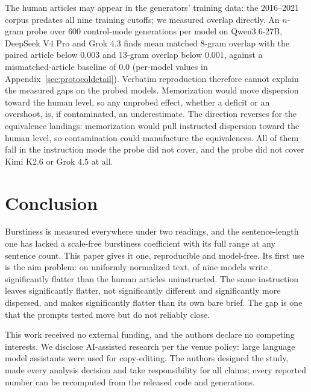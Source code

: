 \documentclass{article}
\begin{document}
The human articles may appear in the generators' training data: the 2016--2021 corpus predates all nine training cutoffs; we measured overlap directly.
An $n$-gram probe over $600$ control-mode generations per model on Qwen3.6-27B, DeepSeek V4 Pro
and Grok 4.3 finds mean matched 8-gram overlap with the paired article below $0.003$ and 13-gram
overlap below $0.001$, against a mismatched-article baseline of $0.0$ (per-model values in
Appendix~\ref{sec:protocoldetail}). Verbatim reproduction therefore cannot explain the measured gaps on the
probed models. Memorization would move dispersion toward the human level, so any unprobed
effect, whether a deficit or an overshoot, is, if contaminated, an underestimate. The direction reverses for the equivalence landings:
memorization would pull instructed dispersion toward the human level, so contamination could manufacture the equivalences. All of them fall in the instruction
mode the probe did not cover, and the probe did not cover Kimi K2.6 or Grok 4.5 at all.

\section{Conclusion}
Burstiness is measured everywhere under two readings, and the sentence-length one has lacked a
scale-free burstiness coefficient with its full range at any sentence count. This paper gives it one,
reproducible and model-free. Its first use is the aim
problem: on uniformly normalized text,  of nine models write significantly
flatter than the human articles uninstructed. The same instruction leaves 
significantly flatter,  not significantly different and 
significantly more dispersed, and makes  significantly flatter than its own
bare brief.
The gap is one that the prompts tested move but do not reliably close.

\begin{ack}
This work received no external funding, and the authors declare no competing interests. We disclose AI-assisted research per the venue
policy: large language model assistants were used for copy-editing. The
authors designed the study, made every analysis decision and take responsibility for all claims;
every reported number can be recomputed from the released code and generations.
\end{ack}



\end{document}
